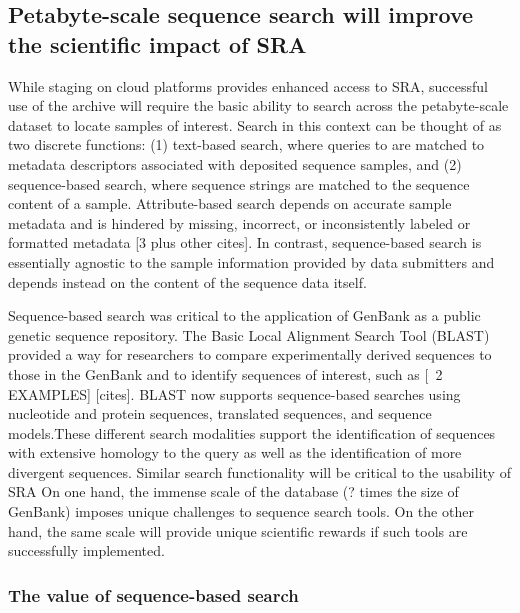 \subsection{Petabyte-scale sequence search will improve the scientific impact of SRA}
\label{sec:psss}

While staging on cloud platforms provides enhanced access to SRA, successful use of the archive will require the basic ability to search across the petabyte-scale dataset to locate samples of interest. Search in this context can be thought of as two discrete functions: (1) text-based search, where queries to are matched to metadata descriptors associated with deposited sequence samples, and (2) sequence-based search, where sequence strings are matched to the sequence content of a sample. Attribute-based search depends on accurate sample metadata and is hindered by missing, incorrect, or inconsistently labeled or formatted metadata [3 plus other cites]. In contrast, sequence-based search is essentially agnostic to the sample information provided by data submitters and depends instead on the content of the sequence data itself.

Sequence-based search was critical to the application of GenBank as a public genetic sequence repository. The Basic Local Alignment Search Tool (BLAST) provided a way for researchers to compare experimentally derived sequences to those in the GenBank and to identify sequences of interest, such as [~2 EXAMPLES] [cites]. BLAST now supports sequence-based searches using nucleotide and protein sequences, translated sequences, and sequence models.These different search modalities support the identification of sequences with extensive homology to the query as well as the identification of more divergent sequences.  Similar search functionality will be critical to the usability of SRA On one hand, the immense scale of the database (? times the size of GenBank) imposes unique challenges to sequence search tools. On the other hand, the same scale will provide unique scientific rewards if such tools are successfully implemented.

\subsubsection{The value of sequence-based search }
\label{sec:SeqSearch}

